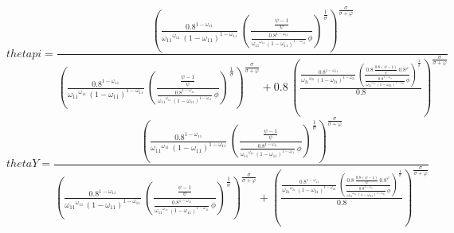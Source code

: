 \begin{dmath*}
thetapi = \frac{\left(\frac{0.8^{1-{{\omega_{11}}}}}{{{\omega_{11}}}^{{{\omega_{11}}}}\, \left(1-{{\omega_{11}}}\right)^{1-{{\omega_{11}}}}}\, \left(\frac{\frac{{{\psi}}-1}{{{\psi}}}}{\frac{0.8^{1-{{\omega_{11}}}}}{{{\omega_{11}}}^{{{\omega_{11}}}}\, \left(1-{{\omega_{11}}}\right)^{1-{{\omega_{11}}}}}\, {{\phi}}}\right)^{\frac{1}{{{\sigma}}}}\right)^{\frac{{{\sigma}}}{{{\sigma}}+{{\varphi}}}}}{\left(\frac{0.8^{1-{{\omega_{11}}}}}{{{\omega_{11}}}^{{{\omega_{11}}}}\, \left(1-{{\omega_{11}}}\right)^{1-{{\omega_{11}}}}}\, \left(\frac{\frac{{{\psi}}-1}{{{\psi}}}}{\frac{0.8^{1-{{\omega_{11}}}}}{{{\omega_{11}}}^{{{\omega_{11}}}}\, \left(1-{{\omega_{11}}}\right)^{1-{{\omega_{11}}}}}\, {{\phi}}}\right)^{\frac{1}{{{\sigma}}}}\right)^{\frac{{{\sigma}}}{{{\sigma}}+{{\varphi}}}}+0.8\, \left(\frac{\frac{0.8^{1-{{\omega_{11}}}}}{{{\omega_{21}}}^{{{\omega_{21}}}}\, \left(1-{{\omega_{21}}}\right)^{1-{{\omega_{21}}}}}\, \left(\frac{0.8\, \frac{0.8\, \left({{\psi}}-1\right)}{{{\psi}}}\, 0.8^{{{\varphi}}}}{\frac{0.8^{1-{{\omega_{11}}}}}{{{\omega_{21}}}^{{{\omega_{21}}}}\, \left(1-{{\omega_{21}}}\right)^{1-{{\omega_{21}}}}}\, {{\phi}}}\right)^{\frac{1}{{{\sigma}}}}}{0.8}\right)^{\frac{{{\sigma}}}{{{\sigma}}+{{\varphi}}}}}
\end{dmath*}
\begin{dmath*}
thetaY = \frac{\left(\frac{0.8^{1-{{\omega_{11}}}}}{{{\omega_{11}}}^{{{\omega_{11}}}}\, \left(1-{{\omega_{11}}}\right)^{1-{{\omega_{11}}}}}\, \left(\frac{\frac{{{\psi}}-1}{{{\psi}}}}{\frac{0.8^{1-{{\omega_{11}}}}}{{{\omega_{11}}}^{{{\omega_{11}}}}\, \left(1-{{\omega_{11}}}\right)^{1-{{\omega_{11}}}}}\, {{\phi}}}\right)^{\frac{1}{{{\sigma}}}}\right)^{\frac{{{\sigma}}}{{{\sigma}}+{{\varphi}}}}}{\left(\frac{0.8^{1-{{\omega_{11}}}}}{{{\omega_{11}}}^{{{\omega_{11}}}}\, \left(1-{{\omega_{11}}}\right)^{1-{{\omega_{11}}}}}\, \left(\frac{\frac{{{\psi}}-1}{{{\psi}}}}{\frac{0.8^{1-{{\omega_{11}}}}}{{{\omega_{11}}}^{{{\omega_{11}}}}\, \left(1-{{\omega_{11}}}\right)^{1-{{\omega_{11}}}}}\, {{\phi}}}\right)^{\frac{1}{{{\sigma}}}}\right)^{\frac{{{\sigma}}}{{{\sigma}}+{{\varphi}}}}+\left(\frac{\frac{0.8^{1-{{\omega_{11}}}}}{{{\omega_{21}}}^{{{\omega_{21}}}}\, \left(1-{{\omega_{21}}}\right)^{1-{{\omega_{21}}}}}\, \left(\frac{0.8\, \frac{0.8\, \left({{\psi}}-1\right)}{{{\psi}}}\, 0.8^{{{\varphi}}}}{\frac{0.8^{1-{{\omega_{11}}}}}{{{\omega_{21}}}^{{{\omega_{21}}}}\, \left(1-{{\omega_{21}}}\right)^{1-{{\omega_{21}}}}}\, {{\phi}}}\right)^{\frac{1}{{{\sigma}}}}}{0.8}\right)^{\frac{{{\sigma}}}{{{\sigma}}+{{\varphi}}}}}
\end{dmath*}

